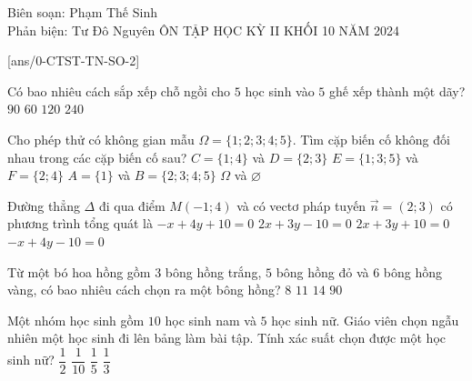 \setcounter{demsode}{2} %
\begin{name}
	{Biên soạn: Phạm Thế Sinh\\
	Phản biện: Tư Đô Nguyên}
	{ÔN TẬP HỌC KỲ II KHỐI 10 NĂM 2024}
\end{name}

\cautn
{}[ans/0-CTST-TN-SO-2]
\setcounter{ex}{0}

\begin{ex} %
	Có bao nhiêu cách sắp xếp chỗ ngồi cho $5$ học sinh vào $5$ ghế xếp thành một dãy?
	\choice
	{$90$}
	{$60$}
	{\True $120$}
	{$240$}
	\loigiai{
	}
\end{ex}

\begin{ex}%
	Cho phép thử có không gian mẫu $\Omega=\{1;2;3;4;5\}$. Tìm cặp biến cố không đối nhau trong các cặp biến cố sau?
	\choice
	{\True $C=\{1;4\}$ và $D=\{2;3\}$}
	{$E=\{1;3;5\}$ và $F=\{2;4\}$}
	{$A=\{1\}$ và $B=\{2;3;4;5\}$}
	{$\Omega$ và $\varnothing$}
	\loigiai{
	}
\end{ex}

\begin{ex}%
Đường thẳng $\Delta$ đi qua điểm $M(-1;4)$ và có vectơ pháp tuyến $\vec{n}=(2;3)$ có phương trình tổng quát là
\choice
{$-x+4y+10=0$}
{\True $2x+3y-10=0$}
{$2x+3y+10=0$}
{$-x+4y-10=0$}
\loigiai{

}
\end{ex}

\begin{ex}%
Từ một bó hoa hồng gồm $3$ bông hồng trắng, $5$ bông hồng đỏ và $6$ bông hồng vàng, có bao nhiêu cách chọn ra một bông hồng?
\choice
{$8$}
{$11$}
{\True $14$}
{$90$}
\loigiai{

}
\end{ex}

\begin{ex}%
Một nhóm học sinh gồm $10$ học sinh nam và $5$ học sinh nữ. Giáo viên chọn ngẫu nhiên một học sinh đi lên bảng làm bài tập. Tính xác suất chọn được một học sinh nữ?
\choice
{$\dfrac{1}{2}$}
{$\dfrac{1}{10}$}
{$\dfrac{1}{5}$}
{\True $\dfrac{1}{3}$}
\loigiai{

}
\end{ex}

